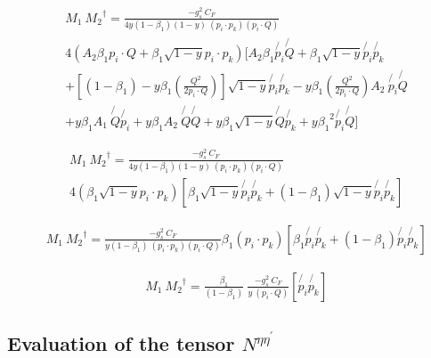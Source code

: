\begin{equation}
\begin{split}
&M_1\: {M_2}^{\dagger} = \frac{-g_s^2\: C_F }{4y(1-\beta_1) (1-y)\:(p_i \cdot p_k)(p_i \cdot Q)} \\
&4(A_2\beta_1 {p_i}\cdot {{Q}}+\beta_1 \sqrt{1-y}{p_i}\cdot {{p_k}})[A_2\beta_1 \not{p_i}\not{Q}+\beta_1 \sqrt{1-y}\not{p_i} \not{p_k}\\
&+ [(1-\beta_1)-y\beta_1 (\frac{Q^2}{2p_i \cdot Q})] \sqrt{1-y}\not{p_i}\not{p_k}-y {\beta_1} (\frac{Q^2}{2p_i \cdot Q}) A_2\: \not{p_i}\not{Q}\\
&+y {\beta_1} A_1 \:\not{Q}\not{p_i}+y {\beta_1} A_2 \:\not{Q}\not{Q}+y {\beta_1}\sqrt{1-y}\not{Q}\not{p_k}+y {\beta_1}^2 \not{p_i}\not{Q} ]
\end{split}
\end{equation}

\begin{equation}
\begin{split}
&M_1\: {M_2}^{\dagger} = \frac{-g_s^2\: C_F }{4y(1-\beta_1) (1-y)\:(p_i \cdot p_k)(p_i \cdot Q)} \\
&4(\beta_1 \sqrt{1-y}{p_i}\cdot {{p_k}})[\beta_1 \sqrt{1-y}\not{p_i} \not{p_k}+ (1-\beta_1) \sqrt{1-y}\not{p_i}\not{p_k}]
\end{split}
\end{equation}

\begin{equation}
\begin{split}
&M_1\: {M_2}^{\dagger} = \frac{-g_s^2\: C_F }{y(1-\beta_1) \:(p_i \cdot p_k)(p_i \cdot Q)} \beta_1( {p_i}\cdot {{p_k}})[\beta_1 \not{p_i} \not{p_k}+ (1-\beta_1) \not{p_i}\not{p_k}]
\end{split}
\end{equation}

\begin{equation}
\begin{split}
&M_1\: {M_2}^{\dagger} = \frac{\beta_1}{(1-\beta_1)}\: \frac{-g_s^2\: C_F }{y \:(p_i \cdot Q)} [\not{p_i} \not{p_k}]
\end{split}
\end{equation}

\subsection*{Evaluation of the tensor $N^{{\eta}{{\eta}^{\prime}}}$}

